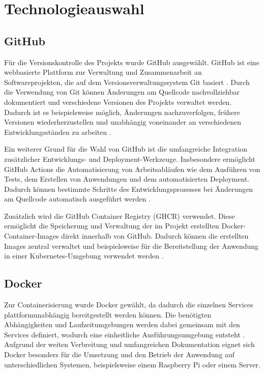 
\section{Technologieauswahl}

\subsection{GitHub}
Für die Versionskontrolle des Projekts wurde GitHub ausgewählt. GitHub ist eine webbasierte Plattform zur Verwaltung und Zusammenarbeit an Softwareprojekten, die auf dem Versionsverwaltungssystem Git basiert \cite{what_is_github}. Durch die Verwendung von Git können Änderungen am Quellcode nachvollziehbar dokumentiert und verschiedene Versionen des Projekts verwaltet werden. Dadurch ist es beispielsweise möglich, Änderungen nachzuverfolgen, frühere Versionen wiederherzustellen und unabhängig voneinander an verschiedenen Entwicklungsständen zu arbeiten \cite{git_version_control} \cite{git_branching}.

Ein weiterer Grund für die Wahl von GitHub ist die umfangreiche Integration zusätzlicher Entwicklungs- und Deployment-Werkzeuge. Insbesondere ermöglicht GitHub Actions die Automatisierung von Arbeitsabläufen wie dem Ausführen von Tests, dem Erstellen von Anwendungen und dem automatisierten Deployment. Dadurch können bestimmte Schritte des Entwicklungsprozesses bei Änderungen am Quellcode automatisch ausgeführt werden \cite{github_actions}.

Zusätzlich wird die GitHub Container Registry (GHCR) verwendet. Diese ermöglicht die Speicherung und Verwaltung der im Projekt erstellten Docker-Container-Images direkt innerhalb von GitHub. Dadurch können die erstellten Images zentral verwaltet und beispielsweise für die Bereitstellung der Anwendung in einer Kubernetes-Umgebung verwendet werden \cite{github_container_registry}.

\subsection{Docker}
Zur Containerisierung wurde Docker gewählt, da dadurch die einzelnen Services plattformunabhängig bereitgestellt werden können. Die benötigten Abhängigkeiten und Laufzeitumgebungen werden dabei gemeinsam mit den Services definiert, wodurch eine einheitliche Ausführungsumgebung entsteht \cite{opc_router_docker}. Aufgrund der weiten Verbreitung und umfangreichen Dokumentation eignet sich Docker besonders für die Umsetzung und den Betrieb der Anwendung auf unterschiedlichen Systemen, beispielsweise einem Raspberry Pi oder einem Server.


